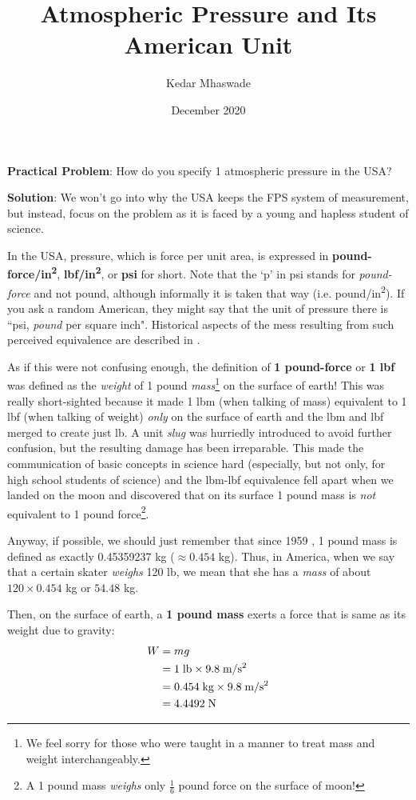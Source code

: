 \documentclass[a6paper]{article}
\begin{document}
\title{Atmospheric Pressure and Its American Unit}
\author{Kedar Mhaswade}
\date{December 2020}
\maketitle
\textbf{Practical Problem}: 
How do you specify 1 atmospheric pressure in the USA?

\textbf{Solution}:
We won't go into why the USA keeps the FPS system of measurement, but instead, focus on the problem as it is faced by a young and hapless student of science.

In the USA, pressure, which is force per unit area, is expressed in \textbf{pound-force/in\textsuperscript{2}}, \textbf{lbf/in\textsuperscript{2}}, or \textbf{psi} for short. Note that the `p' in psi stands for \emph{pound-force} and not pound, although informally it is taken that way (i.e. pound/in\textsuperscript{2}). If you ask a random American, they might say that the unit of pressure there is ``psi, \emph{pound} per square inch". Historical aspects of the mess resulting from such perceived equivalence are described in \cite{esu}.

As if this were not confusing enough, the definition of \textbf{1 pound-force} or \textbf{1 lbf} was defined as the \emph{weight} of 1 pound \emph{mass}\footnote{We feel sorry for those who were taught in a manner to treat mass and weight interchangeably.} on the surface of earth! This was really short-sighted because it made 1 lbm (when talking of mass) equivalent to 1 lbf (when talking of weight) \emph{only} on the surface of earth and the lbm and lbf merged to create just lb. A unit \emph{slug} was hurriedly introduced to avoid further confusion, but the resulting damage has been irreparable. This made the communication of basic concepts in science hard (especially, but not only, for high school students of science) and the lbm-lbf equivalence fell apart when we landed on the moon and discovered that on its surface 1 pound mass is \emph{not} equivalent to 1 pound force\footnote{A 1 pound mass \emph{weighs} only $\frac{1}{6}$ pound force on the surface of moon!}.

Anyway, if possible, we should just remember that since 1959 \cite{pound-mass-current}, 1 pound mass is defined as exactly 0.45359237 \si{kg} ($\approx 0.454$ \si{kg}). Thus, in America, when we say that a certain skater \emph{weighs} 120 lb, we mean that she has a \emph{mass} of about $120\times 0.454$ \si{kg} or $54.48$ \si{kg}.

Then, on the surface of earth, a \textbf{1 pound mass} exerts a force that is same as its weight due to gravity:
\begin{align*}
    W 
    &= mg \\
    &= 1\; \text{lb} \times 9.8\; \text{m/s\textsuperscript{2}} \\
    &= 0.454\; \text{kg} \times 9.8\; \text{m/s\textsuperscript{2}}\\
    &= 4.4492\; \text{N} 
\end{align*}
\end{document}
